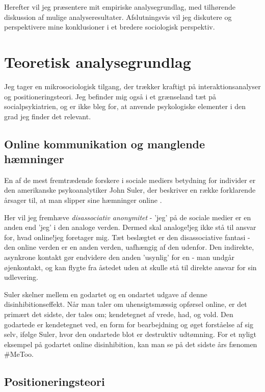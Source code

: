 Herefter vil jeg præsentere mit empiriske analysegrundlag, med
tilhørende diskussion af mulige analyseresultater. Afslutningsvis
vil jeg diskutere og perspektivere mine konklusioner i et bredere
sociologisk perspektiv.

\section{Teoretisk analysegrundlag}

Jeg tager en mikrosociologisk tilgang, der trækker kraftigt på
interaktionsanalyser og positioneringsteori. Jeg befinder mig også
i et grænseland tæt på socialpsykiatrien, og er ikke bleg for, at
anvende psykologiske elementer i den grad jeg finder det relevant.

\subsection{Online kommunikation og manglende hæmninger}

En af de mest fremtrædende forskere i sociale mediers betydning
for individer er den amerikanske psykoanalytiker John Suler, der
beskriver en række forklarende årsager til, at man slipper sine
hæmninger online \autocite{sulerOnlineDisinhibitionEffect2004}.

Her vil jeg fremhæve \emph{disassociativ anonymitet} - 'jeg' på de 
sociale medier er en anden end 'jeg' i den analoge verden.  Dermed
skal analoge!jeg ikke stå til ansvar for, hvad online!jeg 
foretager mig. Tæt beslægtet er den disassociative fantasi - den
online verden er en anden verden, uafhængig af den udenfor. Den
indirekte, asynkrone kontakt gør endvidere den anden 'usynlig' for
en - man undgår øjenkontakt, og kan flygte fra åstedet uden at
skulle stå til direkte ansvar for sin udlevering.

Suler skelner mellem en godartet og en ondartet udgave af denne
disinhibitionseffekt. Når man taler om uhensigtsmæssig opførsel
online, er det primært det sidste, der tales om; kendetegnet af
vrede, had, og vold. Den godartede er kendetegnet ved, en form for
bearbejdning og øget forståelse af sig selv, ifølge Suler, hvor
den ondartede blot er destruktiv udtømning. For et nyligt eksempel
på godartet online disinhibition, kan man se på det sidste års
fænomen \#MeToo.

\subsection{Positioneringsteori}

